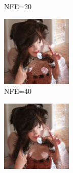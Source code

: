 \documentclass{article}
\begin{document}
\begin{figure}
\begin{subfigure}[b]{0.5\linewidth}
\begin{subfigure}[b]{0.242\linewidth}
        \caption*{NFE=20}
        \end{subfigure}%
        \begin{subfigure}[b]{0.242\linewidth}
        \includegraphics[width=\linewidth]{figures/imagenet128/solver_samples/imagenet128_fm_ot_374_20.png}
        \caption*{NFE=40}
        \end{subfigure}%
        \begin{subfigure}[b]{0.242\linewidth}
        \includegraphics[width=\linewidth]{figures/imagenet128/solver_samples/imagenet128_fm_ot_374_50.png}

\end{subfigure}
\end{subfigure}
\end{figure}
\end{document}
